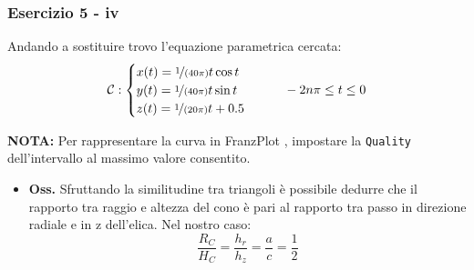 \documentclass{beamer}
\newcommand{\frnzplt}{FranzPlot }
\begin{document}
\begin{frame}
	\frametitle{Esercizio 5 - iv}
        Andando a sostituire trovo l'equazione parametrica cercata:
	\begin{displaymath}
	\mathcal{C}:\begin{cases}
            x(t)= \nicefrac{1}{(40\pi)}t \cos t\\
            y(t)= \nicefrac{1}{(40\pi)}t \sin t\\
            z(t)= \nicefrac{1}{(20\pi)}t + 0.5
	\end{cases}
	\qquad -2 n \pi \leq t\leq 0
	\end{displaymath}

        \textbf{NOTA:} Per rappresentare la curva in \frnzplt, impostare la \texttt{Quality} dell'intervallo al massimo valore consentito.
	
        \vspace{0.5cm}
	\begin{itemize}
                \item
		\textbf{Oss.} Sfruttando la similitudine tra triangoli \`e possibile dedurre che il rapporto
                tra raggio e altezza del cono \`e pari al rapporto tra passo in direzione radiale e in z dell'elica. Nel nostro caso:
		\begin{displaymath}
			\frac{R_C}{H_C} = \frac{h_r}{h_z} = \frac{a}{c} = \frac{1}{2}
		\end{displaymath}
	\end{itemize}
\end{frame}
\end{document}

